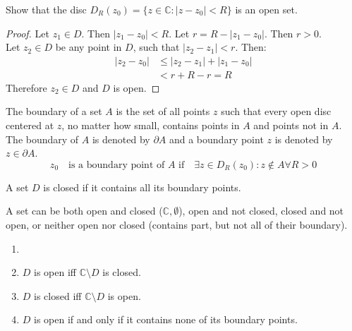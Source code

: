 \begin{example}
    Show that the disc $D_R(z_0) = \{z \in \mathbb{C} : |z - z_0| < R\}$ is an open set.
    \begin{proof}
        Let $z_1 \in D$. Then $|z_1 - z_0| < R$. Let $r = R - |z_1 - z_0|$. Then $r > 0$. \\
        Let $z_2 \in D$ be any point in $D$, such that $|z_2 - z_1| < r$. Then:
        \begin{align*}
            |z_2 - z_0| & \leq |z_2 - z_1| + |z_1 - z_0| \\
                        & < r + R - r = R
        \end{align*}
        Therefore $z_2 \in D$ and $D$ is open.
    \end{proof}
\end{example}

\begin{definition}
    The boundary of a set $A$ is the set of all points $z$ such that every open disc centered at $z$, no matter how small, contains points in $A$ and points not in $A$. \\
    The boundary of $A$ is denoted by $\partial A$ and a boundary point $z$ is denoted by $z \in \partial A$.
    \[z_0 \quad \text{is a boundary point of $A$ if} \quad \exists z \in D_{R}(z_0) :z \notin A \forall R> 0\]
\end{definition}

\begin{definition}
    A set $D$ is closed if it contains all its boundary points.
\end{definition}
\begin{remark}
    A set can be both open and closed ($\mathbb{C}, \emptyset$), open and not closed, closed and not open, or neither open nor closed (contains part, but not all of their boundary).
\end{remark}
\begin{theorem}
    \begin{enumerate}
        \item[]
        \item $D$ is open iff $\mathbb{C} \setminus D$ is closed.
        \item $D$ is closed iff $\mathbb{C} \setminus D$ is open.
        \item $D$ is open if and only if it contains none of its boundary points.
    \end{enumerate}
\end{theorem}

